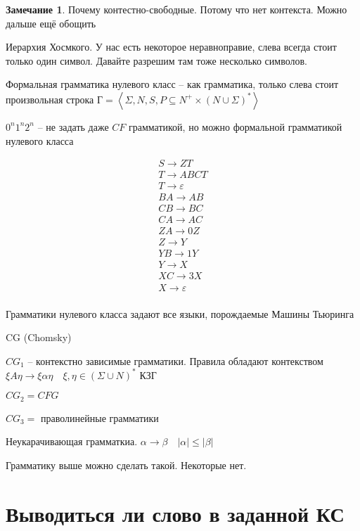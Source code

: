 \documentclass{book}
\theoremstyle{definition}
\newtheorem*{note}{Замечание}
\begin{document}
\begin{note}
    Почему контестно-свободные. Потому что нет контекста. Можно дальше ещё обощить

    Иерархия Хосмкого. У нас есть некоторое неравноправие, слева всегда стоит только один символ. Давайте разрешим там тоже несколько символов.

    Формальная грамматика нулевого класс -- как грамматика, только слева стоит произвольная строка Г$ = \left<\Sigma, N, S, P \subseteq N^+\times \left( N\cup \Sigma \right) ^* \right>$

$0^n 1^n 2^n$ -- не задать даже $CF$ грамматикой, но можно формальной грамматикой нулевого класса

 \begin{gather*}
     S \to ZT\\
     T \to ABCT\\
     T \to \varepsilon\\
     BA \to AB\\
     CB \to BC\\
     CA \to AC\\
     ZA \to 0Z\\
     Z\to Y\\
     YB\to 1Y\\
     Y\to X\\
     XC\to 3X\\
     X \to \varepsilon\\ 
 \end{gather*}

Грамматики нулевого класса задают все языки, порождаемые Машины Тьюринга

CG (Chomsky)

$CG_1$ -- контекстно зависимые грамматики. Правила обладают контекством $\xi A\eta \to \xi\alpha\eta\quad \xi, \eta\in \left( \Sigma \cup N \right) ^*$ КЗГ

$CG_2 = CFG$

$CG_3 = $ праволинейные грамматики

\begin{definition}
    Неукарачивающая грамматкиа. $\alpha \to \beta\quad \left| \alpha \right| \leqslant \left| \beta \right| $

    Грамматику выше можно сделать такой. Некоторые нет.
\end{definition}

\end{note}


\section{Выводиться ли слово в заданной КС}
\end{document}
